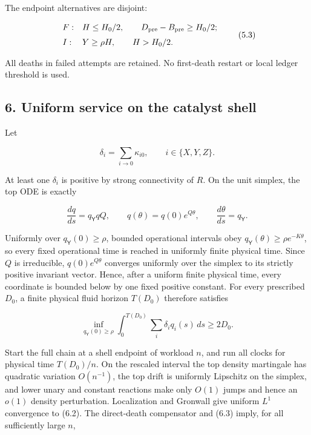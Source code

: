 The endpoint alternatives are disjoint:

\[
 \begin{array}{ll}
 F:& H\le H_0/2,\qquad D_{\rm pre}-B_{\rm pre}\ge H_0/2;\\[2mm]
 I:& Y\ge\rho H,\qquad H>H_0/2.
 \end{array}                                          \tag{5.3}
\]

All deaths in failed attempts are retained. No first-death restart or
local ledger threshold is used.

\subsection{6. Uniform service on the catalyst
shell}

Let

\[
                  \delta_i=\sum_{i\to0}\kappa_{i0},
                  \qquad i\in\{X,Y,Z\}.              \tag{6.1}
\]

At least one \(\delta_i\) is positive by strong connectivity of \(R\).
On the unit simplex, the top ODE is exactly

\[
       \frac{dq}{ds}=q_{\mathsf Y}qQ,
       \qquad q(\theta)=q(0)e^{Q\theta},
       \qquad \frac{d\theta}{ds}=q_{\mathsf Y}.       \tag{6.2}
\]

Uniformly over \(q_{\mathsf Y}(0)\ge\rho\), bounded operational
intervals obey \(q_{\mathsf Y}(\theta)\ge\rho e^{-K\theta}\), so every
fixed operational time is reached in uniformly finite physical time.
Since \(Q\) is irreducible, \(q(0)e^{Q\theta}\) converges uniformly over
the simplex to its strictly positive invariant vector. Hence, after a
uniform finite physical time, every coordinate is bounded below by one
fixed positive constant. For every prescribed \(D_0\), a finite physical
fluid horizon \(T(D_0)\) therefore satisfies

\[
 \inf_{q_{\mathsf Y}(0)\ge\rho}
 \int_0^{T(D_0)}\sum_i\delta_iq_i(s)\,ds\ge2D_0.      \tag{6.3}
\]

Start the full chain at a shell endpoint of workload \(n\), and run all
clocks for physical time \(T(D_0)/n\). On the rescaled interval the top
density martingale has quadratic variation \(O(n^{-1})\), the top drift
is uniformly Lipschitz on the simplex, and lower unary and constant
reactions make only \(O(1)\) jumps and hence an \(o(1)\) density
perturbation. Localization and Gronwall give uniform \(L^1\) convergence
to (6.2). The direct-death compensator and (6.3) imply, for all
sufficiently large \(n\),

